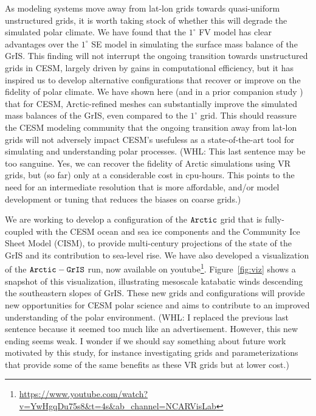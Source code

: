 \documentclass[draft]{agujournal2019}
\begin{document}
As modeling systems move away from lat-lon grids towards quasi-uniform unstructured grids, it is worth taking stock of whether this will degrade the simulated polar climate. We have found that the $1^{\circ}$ FV model has clear advantages over the $1^{\circ}$ SE model in simulating the surface mass balance of the GrIS. This finding will not interrupt the ongoing transition towards unstructured grids in CESM, largely driven by gains in computational efficiency, but it has inspired us to develop alternative configurations that recover or improve on the fidelity of polar climate. We have shown here (and in a prior companion study \cite{VETAL2018TC}) that for CESM, Arctic-refined meshes can substantially improve the simulated mass balances of the GrIS, even compared to the $1^{\circ}$ grid. This should reassure the CESM modeling community that the ongoing transition away from lat-lon grids will not adversely impact CESM's usefuless as a state-of-the-art tool for simulating and understanding polar processes.
{\color{blue} (WHL: This last sentence may be too sanguine.  Yes, we can recover the fidelity of Arctic simulations using VR grids, but (so far) only at a considerable cost in cpu-hours.  This points to the need for an intermediate resolution that is more affordable, and/or model development or tuning that reduces the biases on coarse grids.)}{\color{purple}{Andrew - Maybe better to just state that higher resolution is better: 1deg better than 2deg FV, and ne30 is coarser than 1deg at Greenland latitudes so it's worse. But VR has higher resolution so SR-VR is better. It's all about resolution.}}

We are  working to develop a configuration of the $\tt Arctic$ grid that is fully-coupled with the CESM ocean and sea ice components and the Community Ice Sheet Model (CISM), to provide multi-century projections of the state of the GrIS and its contribution to sea-level rise.
We have also developed a visualization of the $\tt Arctic-GrIS$ run, now available on youtube\footnote{\url{https://www.youtube.com/watch?v=YwHgqDu75s8&t=4s&ab_channel=NCARVisLab}}.
Figure~\ref{fig:viz} shows a snapshot of this visualization, illustrating mesoscale katabatic winds descending the southeastern slopes of GrIS.
These new grids and configurations will provide new opportunities for CESM polar science and aims to contribute to an improved understanding of the polar environment.
{\color{blue} (WHL: I replaced the previous last sentence because it seemed too much like an advertisement.  However, this new ending seems weak.  I wonder if we should say something about future work motivated by this study, for instance investigating grids and parameterizations that provide some of the same benefits as these VR grids but at lower cost.)}
\end{document}
